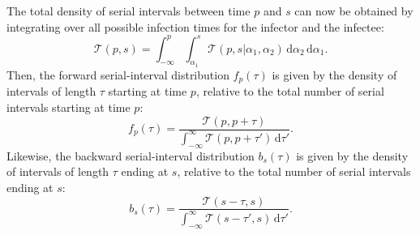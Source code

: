 \documentclass[12pt]{article}
\newcommand{\dd}[1]{\ensuremath{\, \mathrm{d}#1}}
\newcommand{\dtau}{\dd{\tau}}
\newcommand{\psymp}{\ensuremath{p}} %
\newcommand{\ssymp}{\ensuremath{s}} %
\newcommand{\pinf}{\ensuremath{\alpha_1}} %
\newcommand{\sinf}{\ensuremath{\alpha_2}} %
\newcommand{\total}{{\mathcal T}} %
\begin{document}
The total density of serial intervals between time $\psymp$ and $\ssymp$ can now be obtained by integrating over all possible infection times for the infector and the infectee:
\begin{equation}
\total (\psymp,\ssymp) = \int_{-\infty}^{\psymp} \int_{\pinf}^{\ssymp} \total (\psymp,\ssymp | \alpha_1, \alpha_2) \, \mathrm{d}\sinf\,\mathrm{d}\pinf.
\end{equation}
Then, the forward serial-interval distribution $f_\psymp(\tau)$ is given by the density of intervals of length $\tau$ starting at time \psymp, relative to the total number of serial intervals starting at time \psymp: 
\begin{equation}
f_\psymp(\tau) = 
\frac{\total(\psymp, \psymp+\tau)}{\int_{-\infty}^\infty \total(\psymp, \psymp+\tau') \dtau'}.
\label{eq:fserial}
\end{equation}
Likewise, the backward serial-interval distribution $b_\ssymp(\tau)$ is given by the density of intervals of length $\tau$ ending at \ssymp, relative to the total number of serial intervals ending at \ssymp: 
\begin{equation}
b_\ssymp(\tau) = 
\frac{\total(\ssymp-\tau, \ssymp)}{\int_{-\infty}^\infty \total(\ssymp-\tau', \ssymp) \dtau'}.
\label{eq:bserial}
\end{equation}
\end{document}

